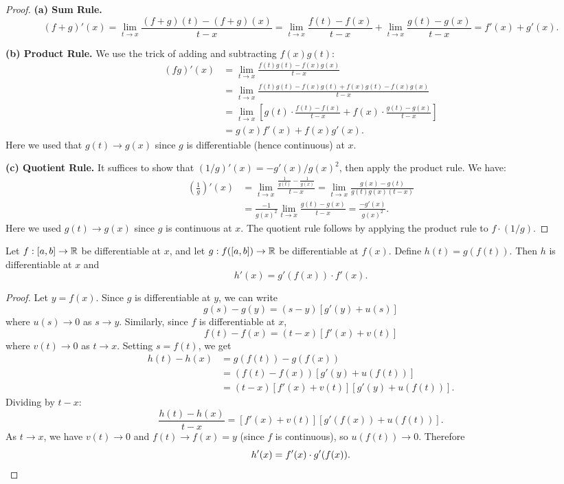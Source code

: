 \documentclass[../master/master.tex]{subfiles}
\begin{document}
\begin{proof}
\textbf{(a) Sum Rule.}
\[
(f+g)'(x) = \lim_{t \to x} \frac{(f+g)(t) - (f+g)(x)}{t - x} = \lim_{t \to x} \frac{f(t) - f(x)}{t-x} + \lim_{t \to x} \frac{g(t) - g(x)}{t - x} = f'(x) + g'(x).
\]

\textbf{(b) Product Rule.} We use the trick of adding and subtracting $f(x)g(t)$:
\begin{align*}
(fg)'(x) &= \lim_{t \to x} \frac{f(t)g(t) - f(x)g(x)}{t - x} \\
&= \lim_{t \to x} \frac{f(t)g(t) - f(x)g(t) + f(x)g(t) - f(x)g(x)}{t - x} \\
&= \lim_{t \to x} \left[ g(t) \cdot \frac{f(t) - f(x)}{t - x} + f(x) \cdot \frac{g(t) - g(x)}{t - x} \right] \\
&= g(x) f'(x) + f(x) g'(x).
\end{align*}
Here we used that $g(t) \to g(x)$ since $g$ is differentiable (hence continuous) at $x$.

\textbf{(c) Quotient Rule.} It suffices to show that $(1/g)'(x) = -g'(x)/g(x)^2$, then apply the product rule. We have:
\begin{align*}
\left(\frac{1}{g}\right)'(x) &= \lim_{t \to x} \frac{\frac{1}{g(t)} - \frac{1}{g(x)}}{t - x} = \lim_{t \to x} \frac{g(x) - g(t)}{g(t)g(x)(t - x)} \\
&= \frac{-1}{g(x)^2} \lim_{t \to x} \frac{g(t) - g(x)}{t - x} = \frac{-g'(x)}{g(x)^2}.
\end{align*}
Here we used $g(t) \to g(x)$ since $g$ is continuous at $x$. The quotient rule follows by applying the product rule to $f \cdot (1/g)$.
\end{proof}

\begin{theorem}
Let $f: [a,b] \to \mathbb{R}$ be differentiable at $x$, and let $g: f([a,b]) \to \mathbb{R}$ be differentiable at $f(x)$. Define $h(t) = g(f(t))$. Then $h$ is differentiable at $x$ and
\[
h'(x) = g'(f(x)) \cdot f'(x).
\]
\end{theorem}

\begin{proof}
Let $y = f(x)$. Since $g$ is differentiable at $y$, we can write
\[
g(s) - g(y) = (s - y)[g'(y) + u(s)]
\]
where $u(s) \to 0$ as $s \to y$. Similarly, since $f$ is differentiable at $x$,
\[
f(t) - f(x) = (t - x)[f'(x) + v(t)]
\]
where $v(t) \to 0$ as $t \to x$. Setting $s = f(t)$, we get
\begin{align*}
h(t) - h(x) &= g(f(t)) - g(f(x)) \\
&= (f(t) - f(x))[g'(y) + u(f(t))] \\
&= (t - x)[f'(x) + v(t)][g'(y) + u(f(t))].
\end{align*}
Dividing by $t - x$:
\[
\frac{h(t) - h(x)}{t - x} = [f'(x) + v(t)][g'(f(x)) + u(f(t))].
\]
As $t \to x$, we have $v(t) \to 0$ and $f(t) \to f(x) = y$ (since $f$ is continuous), so $u(f(t)) \to 0$. Therefore
\[
h'(x) = f'(x) \cdot g'(f(x)). \qedhere
\]
\end{proof}
\end{document}
